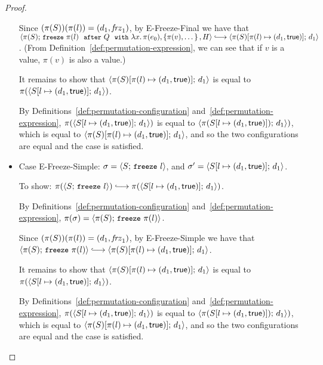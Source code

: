 \begin{proof}
\begin{itemize}

      Since $(\pi(S))(\pi(l)) = (d_1, \mathit{frz}_1)$, by {\sc
        E-Freeze-Final} we have that \\
      $\config{\pi(S)}{\freezeafterfull{\pi(l)}{Q}{\lam{x}{\pi(e_0)}}{\setof{\pi(v),
            \dots}}{H}} \parstepsto \\
      \config{\extS{\pi(S)}{\pi(l)}{d_1}{\frozentrue}}{d_1}$.  (From
      Definition~\ref{def:permutation-expression}, we can see that if
      $v$ is a value, $\pi(v)$ is also a value.)

      It remains to show that
      $\langle \pi(S)[\pi(l) \mapsto (d_1, \textsf{true})];\, d_1 \rangle$ is equal
      to $\pi(\langle S[l \mapsto (d_1, \textsf{true})];\, d_1 \rangle)$.

      By Definitions~\ref{def:permutation-configuration}
      and~\ref{def:permutation-expression},
      $\pi(\langle S[l \mapsto (d_1, \textsf{true})];\, d_1 \rangle)$ is equal to
      $\langle \pi(S[l \mapsto (d_1, \textsf{true})]);\, d_1 \rangle)$, which is
      equal to
      $\langle \pi(S)[\pi(l) \mapsto (d_1, \textsf{true})];\, d_1 \rangle$, and so
      the two configurations are equal and the case is satisfied.

    \item Case {\sc E-Freeze-Simple}: $\sigma =
      \langle S;\, \mbox{\small{\texttt{freeze}}}~l \rangle$, and $\sigma' =
      \langle S[l \mapsto (d_1, \textsf{true})];\, d_1 \rangle$.

      To show: $\pi(\config{S}{\freeze{l}}) \parstepsto
      \pi(\config{\extS{S}{l}{d_1}{\frozentrue}}{d_1})$.

      By Definitions~\ref{def:permutation-configuration}
      and~\ref{def:permutation-expression}, $\pi(\sigma) =
      \langle \pi(S);\, \mbox{\small{\texttt{freeze}}}~\pi(l) \rangle$.

      Since $(\pi(S))(\pi(l)) = (d_1, \mathit{frz}_1)$, by {\sc
        E-Freeze-Simple} we have that
      $\config{\pi(S)}{\freeze{\pi(l)}} \parstepsto
      \config{\extS{\pi(S)}{\pi(l)}{d_1}{\frozentrue}}{d_1}$.

      It remains to show that
      $\langle \pi(S)[\pi(l) \mapsto (d_1, \textsf{true})];\, d_1 \rangle$ is equal
      to $\pi(\langle S[l \mapsto (d_1, \textsf{true})];\, d_1 \rangle)$.

      By Definitions~\ref{def:permutation-configuration}
      and~\ref{def:permutation-expression},
      $\pi(\langle S[l \mapsto (d_1, \textsf{true})];\, d_1 \rangle)$ is equal to
      $\langle \pi(S[l \mapsto (d_1, \textsf{true})]);\, d_1 \rangle)$, which is
      equal to
      $\langle \pi(S)[\pi(l) \mapsto (d_1, \textsf{true})];\, d_1 \rangle$, and so
      the two configurations are equal and the case is satisfied.


\end{itemize}
\end{proof}
